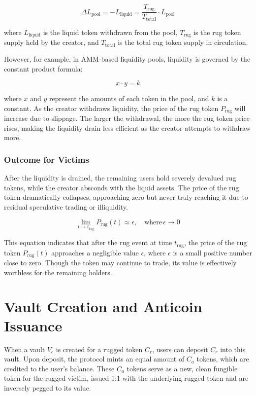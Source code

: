 \documentclass{article}
\begin{document}
\[
\Delta L_{\text{pool}} = - L_{\text{liquid}} = \frac{T_{\text{rug}}}{T_{\text{total}}} \cdot L_{\text{pool}}
\]

where \( L_{\text{liquid}} \) is the liquid token withdrawn from the pool, \( T_{\text{rug}} \) is the rug token supply held by the creator, and \( T_{\text{total}} \) is the total rug token supply in circulation.

However, for example, in AMM-based liquidity pools, liquidity is governed by the constant product formula:

\[
x \cdot y = k
\]

where \( x \) and \( y \) represent the amounts of each token in the pool, and \( k \) is a constant. As the creator withdraws liquidity, the price of the rug token \( P_{\text{rug}} \) will increase due to slippage. The larger the withdrawal, the more the rug token price rises, making the liquidity drain less efficient as the creator attempts to withdraw more.

\subsubsection{Outcome for Victims}

After the liquidity is drained, the remaining users hold severely devalued rug tokens, while the creator absconds with the liquid assets. The price of the rug token dramatically collapses, approaching zero but never truly reaching it due to residual speculative trading or illiquidity.

\[
\lim_{t \to t_{\text{rug}}} P_{\text{rug}}(t) \approx \epsilon, \quad \text{where} \, \epsilon \to 0
\]

This equation indicates that after the rug event at time \( t_{\text{rug}} \), the price of the rug token \( P_{\text{rug}}(t) \) approaches a negligible value \( \epsilon \), where \( \epsilon \) is a small positive number close to zero. Though the token may continue to trade, its value is effectively worthless for the remaining holders.







\section{Vault Creation and Anticoin Issuance}
When a vault $V_c$ is created for a rugged token $C_r$, users can deposit $C_r$ into this vault. Upon deposit, the protocol mints an equal amount of $C_a$ tokens, which are credited to the user's balance. These $C_a$ tokens serve as a new, clean fungible token for the rugged victim, issued 1:1 with the underlying rugged token and are inversely pegged to its value.
\end{document}

